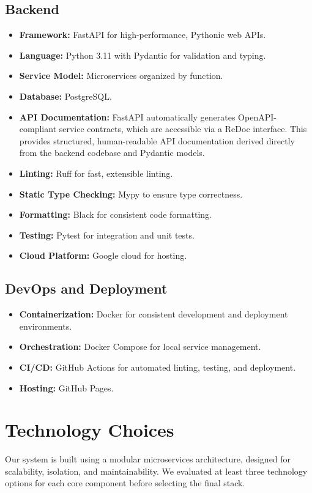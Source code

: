 \documentclass[12pt]{article}
\begin{document}
\subsection{Backend}
\begin{itemize}
  \item \textbf{Framework:} FastAPI for high-performance, Pythonic web APIs.
  \item \textbf{Language:} Python 3.11 with Pydantic for validation and typing.
  \item \textbf{Service Model:} Microservices organized by function.
  \item \textbf{Database:} PostgreSQL.
  \item \textbf{API Documentation:} FastAPI automatically generates OpenAPI-compliant service contracts, which are accessible via a ReDoc interface. This provides structured, human-readable API documentation derived directly from the backend codebase and Pydantic models.
  \item \textbf{Linting:} Ruff for fast, extensible linting.
  \item \textbf{Static Type Checking:} Mypy to ensure type correctness.
  \item \textbf{Formatting:} Black for consistent code formatting.
  \item \textbf{Testing:} Pytest for integration and unit tests.
  \item \textbf{Cloud Platform:} Google cloud for hosting.
\end{itemize}

\subsection{DevOps and Deployment}
\begin{itemize}
  \item \textbf{Containerization:} Docker for consistent development and deployment environments.
  \item \textbf{Orchestration:} Docker Compose for local service management.
  \item \textbf{CI/CD:} GitHub Actions for automated linting, testing, and deployment.
  \item \textbf{Hosting:} GitHub Pages.
\end{itemize}

\section{Technology Choices}
Our system is built using a modular microservices architecture, designed for scalability, isolation, and maintainability. We evaluated at least three technology options for each core component before selecting the final stack.
\end{document}
